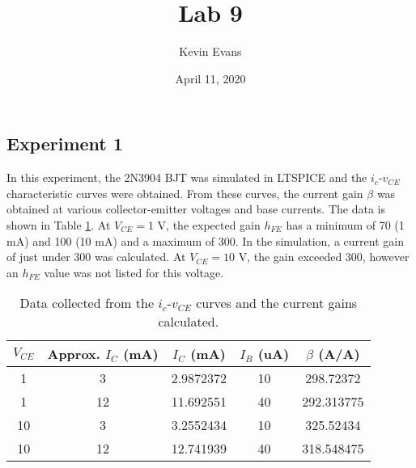 \documentclass{homework}
\title{Lab 9}
\author{Kevin Evans}
\date{April 11, 2020}
\begin{document}
	\maketitle
	\vspace{-1em}
	\subsection*{Experiment 1}
	\vspace{-0.2em}
	In this experiment, the 2N3904 BJT was simulated in LTSPICE and the $i_c$-$v_{CE}$ characteristic curves were obtained. From these curves, the current gain $\beta$ was obtained at various collector-emitter voltages and base currents. The data is shown in Table \ref{table:exp1}. At $V_{CE}=1$ V, the expected gain $h_{FE}$ has a minimum of 70 (1 mA) and 100 (10 mA) and a maximum of 300. In the simulation, a current gain of just under 300 was calculated. At $V_{CE}=10$ V, the gain exceeded 300, however an $h_{FE}$ value was not listed for this voltage.
	\vspace{-1em}
	\begin{table}[H]
		\centering
		\caption{Data collected from the $i_c$-$v_{CE}$ curves and the current gains calculated.}
		\label{table:exp1}
		\begin{tabular}{@{}ccccc@{}}
			\toprule
			$V_{CE}$ & Approx. $I_C$ (mA) & $I_C$ (mA) & $I_B$ (uA) & $\beta$ (A/A) \\ \midrule
			1   & 3                       & 2.9872372       & 10          & 298.72372  \\
			1   & 12                      & 11.692551       & 40          & 292.313775 \\
			10  & 3                       & 3.2552434       & 10          & 325.52434  \\
			10  & 12                      & 12.741939       & 40          & 318.548475 \\ \bottomrule
		\end{tabular}
	\end{table}
\end{document}
